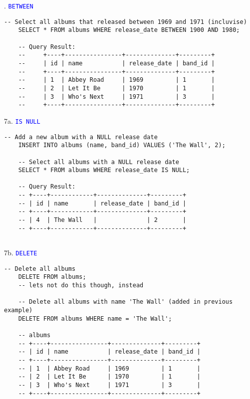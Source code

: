. \textcolor{blue}{\texttt{BETWEEN}}
\begin{lstlisting}[style=sql]
    -- Select all albums that released between 1969 and 1971 (incluvise)
    SELECT * FROM albums WHERE release_date BETWEEN 1900 AND 1980;

    -- Query Result:
    --     +----+----------------+--------------+---------+
    --     | id | name           | release_date | band_id |
    --     +----+----------------+--------------+---------+
    --     | 1  | Abbey Road     | 1969         | 1       |
    --     | 2  | Let It Be      | 1970         | 1       |
    --     | 3  | Who's Next     | 1971         | 3       |
    --     +----+----------------+--------------+---------+

\end{lstlisting}

\noindent
7a. \textcolor{blue}{\texttt{IS NULL}}

\begin{lstlisting}[style=sql]
    -- Add a new album with a NULL release date
    INSERT INTO albums (name, band_id) VALUES ('The Wall', 2);

    -- Select all albums with a NULL release date
    SELECT * FROM albums WHERE release_date IS NULL;

    -- Query Result:
    -- +----+------------+--------------+---------+
    -- | id | name       | release_date | band_id |
    -- +----+------------+--------------+---------+
    -- | 4  | The Wall   |              | 2       |
    -- +----+------------+--------------+---------+
    
\end{lstlisting}

\noindent
7b. \textcolor{blue}{\texttt{DELETE}}

\begin{lstlisting}[style=sql]
    -- Delete all albums
    DELETE FROM albums;
    -- lets not do this though, instead

    -- Delete all albums with name 'The Wall' (added in previous example)
    DELETE FROM albums WHERE name = 'The Wall';

    -- albums
    -- +----+----------------+--------------+---------+
    -- | id | name           | release_date | band_id |
    -- +----+----------------+--------------+---------+
    -- | 1  | Abbey Road     | 1969         | 1       |
    -- | 2  | Let It Be      | 1970         | 1       |
    -- | 3  | Who's Next     | 1971         | 3       |
    -- +----+----------------+--------------+---------+

\end{lstlisting}